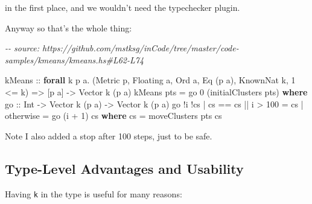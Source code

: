 \documentclass[]{article}
\newenvironment{Shaded}{}{}
\newcommand{\CommentTok}[1]{\textcolor[rgb]{0.38,0.63,0.69}{\textit{#1}}}
\newcommand{\DataTypeTok}[1]{\textcolor[rgb]{0.56,0.13,0.00}{#1}}
\newcommand{\DecValTok}[1]{\textcolor[rgb]{0.25,0.63,0.44}{#1}}
\newcommand{\FunctionTok}[1]{\textcolor[rgb]{0.02,0.16,0.49}{#1}}
\newcommand{\KeywordTok}[1]{\textcolor[rgb]{0.00,0.44,0.13}{\textbf{#1}}}
\newcommand{\NormalTok}[1]{#1}
\newcommand{\OperatorTok}[1]{\textcolor[rgb]{0.40,0.40,0.40}{#1}}
\newcommand{\OtherTok}[1]{\textcolor[rgb]{0.00,0.44,0.13}{#1}}
\begin{document}
in the first place, and we wouldn't need the typechecker plugin.

Anyway so that's the whole thing:

\begin{Shaded}
\begin{Highlighting}[]
\CommentTok{{-}{-} source: https://github.com/mstksg/inCode/tree/master/code{-}samples/kmeans/kmeans.hs\#L62{-}L74}

\OtherTok{kMeans ::}
  \KeywordTok{forall}\NormalTok{ k p a}\OperatorTok{.}
\NormalTok{  (}\DataTypeTok{Metric}\NormalTok{ p, }\DataTypeTok{Floating}\NormalTok{ a, }\DataTypeTok{Ord}\NormalTok{ a, }\DataTypeTok{Eq}\NormalTok{ (p a), }\DataTypeTok{KnownNat}\NormalTok{ k, }\DecValTok{1} \OperatorTok{\textless{}=}\NormalTok{ k) }\OtherTok{=\textgreater{}}
\NormalTok{  [p a] }\OtherTok{{-}\textgreater{}}
  \DataTypeTok{Vector}\NormalTok{ k (p a)}
\NormalTok{kMeans pts }\OtherTok{=}\NormalTok{ go }\DecValTok{0}\NormalTok{ (initialClusters pts)}
  \KeywordTok{where}
\OtherTok{    go ::} \DataTypeTok{Int} \OtherTok{{-}\textgreater{}} \DataTypeTok{Vector}\NormalTok{ k (p a) }\OtherTok{{-}\textgreater{}} \DataTypeTok{Vector}\NormalTok{ k (p a)}
\NormalTok{    go }\OperatorTok{!}\NormalTok{i }\OperatorTok{!}\NormalTok{cs}
      \OperatorTok{|}\NormalTok{ cs }\OperatorTok{==}\NormalTok{ cs\textquotesingle{} }\OperatorTok{||}\NormalTok{ i }\OperatorTok{\textgreater{}} \DecValTok{100} \OtherTok{=}\NormalTok{ cs}
      \OperatorTok{|} \FunctionTok{otherwise} \OtherTok{=}\NormalTok{ go (i }\OperatorTok{+} \DecValTok{1}\NormalTok{) cs\textquotesingle{}}
      \KeywordTok{where}
\NormalTok{        cs\textquotesingle{} }\OtherTok{=}\NormalTok{ moveClusters pts cs}
\end{Highlighting}
\end{Shaded}

Note I also added a stop after 100 steps, just to be safe.

\subsection{Type-Level Advantages and
Usability}\label{type-level-advantages-and-usability}

Having \texttt{k} in the type is useful for many reasons:
\end{document}
